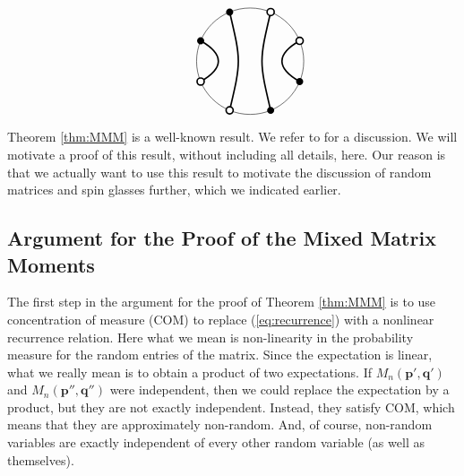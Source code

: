 \documentclass[12pt]{report}
\theoremstyle{definition}
\begin{document}
$$\begin{tikzpicture}
\end{tikzpicture}
\hspace{1cm}
\begin{tikzpicture}
\draw (0,0) circle (1.5cm);
\draw[very thick] (67.5:1.5cm) .. controls (0:0.25cm) .. (-67.5:1.5cm);
\draw[very thick] (22.5:1.5cm) .. controls (15:0.75cm) and (-15:0.75cm)  .. (-22.5:1.5cm);
\draw[very thick] (112.5:1.5cm) .. controls (180:0.25cm)  .. (-112.5:1.5cm);
\draw[very thick] (157.5:1.5cm) .. controls (165:0.75cm) and (195:0.75cm)  .. (202.5:1.5cm);
\fill (157.5:1.5cm) circle (1mm);
\fill (112.5:1.5cm) circle (1mm);
\filldraw[fill=white, very thick] (67.5:1.5cm) circle (1mm);
\filldraw[fill=white, very thick] (22.5:1.5cm) circle (1mm);
\fill (-22.5:1.5cm) circle (1mm);
\fill (-67.5:1.5cm) circle (1mm);
\filldraw[fill=white, very thick] (-112.5:1.5cm) circle (1mm);
\filldraw[fill=white, very thick] (-157.5:1.5cm) circle (1mm);
\end{tikzpicture}
$$
Theorem \ref{thm:MMM} is a well-known result. We refer to \cite{Kemp} for a discussion.
We will motivate a proof of this result, without including all details, here.
Our reason is that we actually want to use this result to motivate the discussion of random matrices and spin glasses further, which we indicated earlier.



\subsection{Argument for the Proof of the Mixed Matrix Moments}
\label{subsec:Argument}
The first step in the argument for the proof of Theorem \ref{thm:MMM} is to use concentration of measure (COM) to replace (\ref{eq:recurrence})
with a nonlinear recurrence relation.
Here what we mean is non-linearity in the probability measure for the random entries of the matrix.
Since the expectation is linear, what we really mean is to obtain a product of two expectations.
If $M_n(\mathbf{p}',\mathbf{q}')$ and $M_n(\mathbf{p}'',\mathbf{q}'')$ were independent, then we could
replace the expectation by a product,
but they are not exactly independent.
Instead, they satisfy COM, which means that they are approximately non-random.
And, of course, non-random variables are exactly independent of every other random variable
(as well as themselves).
\end{document}
